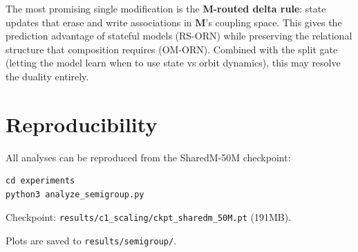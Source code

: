 \documentclass[11pt, a4paper]{article}
\newcommand{\M}{\mathbf{M}}
\theoremstyle{plain}
\theoremstyle{remark}
\begin{document}
The most promising single modification is the \textbf{M-routed delta rule}: state updates that erase and write associations in $\M$'s coupling space.
This gives the prediction advantage of stateful models (RS-ORN) while preserving the relational structure that composition requires (OM-ORN).
Combined with the split gate (letting the model learn when to use state vs orbit dynamics), this may resolve the duality entirely.

\section{Reproducibility}

All analyses can be reproduced from the SharedM-50M checkpoint:
\begin{verbatim}
cd experiments
python3 analyze_semigroup.py
\end{verbatim}

Checkpoint: \texttt{results/c1\_scaling/ckpt\_sharedm\_50M.pt} (191MB).

Plots are saved to \texttt{results/semigroup/}.
\end{document}
